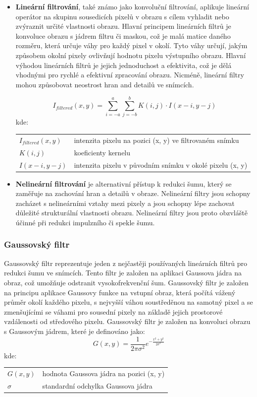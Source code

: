 \documentclass[male,czech,api_ing]{thesis}
\makeatletter
\newenvironment{conditions}[1][kde:]
    {#1 \begin{tabular}[t]{>{$}l<{$} @{${}={}$} >{\raggedright\arraybackslash}p{10cm}}}
    {\end{tabular}}
\makeatother
\begin{document}
\begin{itemize}
    \item \textbf{Lineární filtrování}, také známo jako konvoluční filtrování, aplikuje lineární operátor na skupinu sousedicích pixelů v obrazu s cílem vyhladit nebo zvýraznit určité vlastnosti obrazu. Hlavní principem lineárních filtrů je konvoluce obrazu s jádrem filtru či maskou, což je malá matice daného rozměru, která určuje váhy pro každý pixel v okolí. Tyto váhy určují, jakým způsobem okolní pixely ovlivňují hodnotu pixelu výstupního obrazu. Hlavní výhodou lineárních filtrů je jejich jednoduchost a efektivita, což je dělá vhodnými pro rychlé a efektivní zpracování obrazu. Nicméně, lineární filtry mohou způsobovat neostrost hran and detailů ve snímcích. \cite{ImageDenoisingTechniques, XRayImageProcessing}
    
    \begin{equation}
        I_{filtered}(x, y) = \sum_{i=-a}^{a} \sum_{j=-b}^{b} K(i, j) \cdot I(x-i, y-j)
    \end{equation}
    \begin{conditions}
        I_{filtered}(x, y) & intenzita pixelu na pozici (x, y) ve filtrovaném snímku \\
        K(i, j) & koeficienty kernelu \\
        I(x-i, y-j) & intenzita pixelu v původním snímku v okolé pixelu (x, y) 
    \end{conditions}
    \item \textbf{Nelineární filtrování} je alternativní přístup k redukci šumu, který se zaměřuje na zachování hran a detailů v obraze. Nelineární filtry jsou schopny zacházet s nelineárními vztahy mezi pixely a jsou schopny lépe zachovat důležité strukturální vlastnosti obrazu. Nelineární filtry jsou proto obzvláště účinné při redukci impulzního či spekle šumu. \cite{ImageDenoisingTechniques, XRayImageProcessing}
\end{itemize}

\subsubsection{Gaussovský filtr}
Gaussovský filtr reprezentuje jeden z nejčastěji používaných lineárních filtrů pro redukci šumu ve snímcích. Tento filtr je založen na aplikaci Gaussova jádra na obraz, což umožňuje odstranit vysokofrekvenční šum. Gaussovský filtr je založen na principu aplikace Gaussovy funkce na vstupní obraz, která počítá vážený průměr okolí každého pixelu, s nejvyšší váhou soustředěnou na samotný pixel a se zmenšujícími se váhami pro sousední pixely na základě jejich prostorové vzdálenosti od středového pixelu. Gaussovský filtr je založen na konvoluci obrazu s Gaussovým jádrem, které je definováno jako:
\begin{equation}
    G(x, y) = \frac{1}{2\pi\sigma^2} e^{-\frac{x^2 + y^2}{2\sigma^2}}
\end{equation}
\begin{conditions}
    G(x, y) & hodnota Gaussova jádra na pozici (x, y) \\
    \sigma & standardní odchylka Gaussova jádra
\end{conditions}
\end{document}
